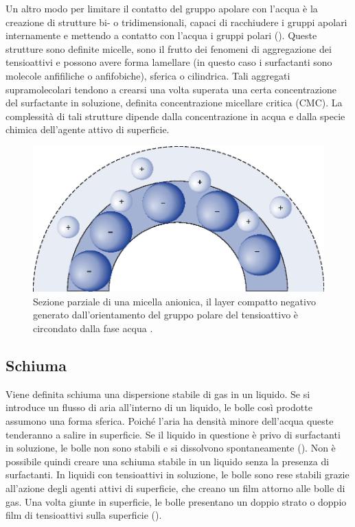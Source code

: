 Un altro modo per limitare il contatto del gruppo apolare con l'acqua è la creazione di strutture bi- o tridimensionali, capaci di racchiudere i gruppi apolari internamente e mettendo a contatto con l'acqua i gruppi polari (). Queste strutture sono definite micelle, sono il frutto dei fenomeni di aggregazione dei tensioattivi e possono avere forma lamellare (in questo caso i surfactanti sono molecole anfifiliche o anfifobiche), sferica o cilindrica.  Tali aggregati supramolecolari tendono a crearsi una volta superata una certa concentrazione del surfactante in soluzione, definita concentrazione micellare critica (CMC). La complessità di tali strutture dipende dalla concentrazione in acqua e dalla specie chimica dell'agente attivo di superficie.

\begin{figure}[htbp]
    \centering
    \includegraphics[width=.5\textwidth]{fig/foamer/micelle.eps}
    \caption{Sezione parziale di una micella anionica, il layer compatto negativo generato dall'orientamento del gruppo polare del tensioattivo è circondato dalla fase acqua  \parencite{attwood2012fasttrack}.}
    \label{fig:micelle}
\end{figure}

\subsection{Schiuma}
Viene definita schiuma una dispersione stabile di gas in un liquido. Se si introduce un flusso di aria all'interno di un liquido, le bolle così prodotte assumono una forma sferica. Poiché l'aria ha densità minore dell'acqua queste tenderanno a salire in superficie. Se il liquido in questione è privo di surfactanti in soluzione, le bolle non sono stabili e si dissolvono spontaneamente (). Non è possibile quindi creare una schiuma stabile in un liquido senza la presenza di surfactanti. In liquidi con tensioattivi in soluzione, le bolle sono rese stabili grazie all'azione degli agenti attivi di superficie, che creano un film attorno alle bolle di gas. Una volta giunte in superficie, le bolle presentano un doppio strato o doppio film di tensioattivi sulla superficie ().

